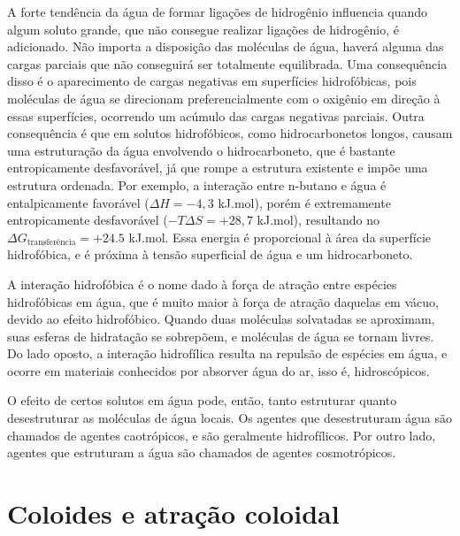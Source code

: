	A forte tendência da água de formar ligações de hidrogênio influencia quando algum soluto grande, que não consegue realizar ligações de hidrogênio, é adicionado. Não importa a disposição das moléculas de água, haverá alguma das cargas parciais que não conseguirá ser totalmente equilibrada. Uma consequência disso é o aparecimento de cargas negativas em superfícies hidrofóbicas, pois moléculas de água se direcionam preferencialmente com o oxigênio em direção à essas superfícies, ocorrendo um acúmulo das cargas negativas parciais. Outra consequência é que em solutos hidrofóbicos, como hidrocarbonetos longos, causam uma estruturação da água envolvendo o hidrocarboneto, que é bastante entropicamente desfavorável, já que rompe a estrutura existente e impõe uma estrutura ordenada. Por exemplo, a interação entre n-butano e água é entalpicamente favorável (\(\Delta H = -4,3\) kJ.mol\menosUm), porém é extremamente entropicamente desfavorável (\(-T\Delta S = +28,7\) kJ.mol\menosUm), resultando no \(\Delta G_{\mathrm{transferência}} = +24.5\) kJ.mol\menosUm. Essa energia é proporcional à área da superfície hidrofóbica, e é próxima à tensão superficial de água e um hidrocarboneto.
	
	A interação hidrofóbica é o nome dado à força de atração entre espécies hidrofóbicas em água, que é muito maior à força de atração daquelas em vácuo, devido ao efeito hidrofóbico. Quando duas moléculas solvatadas se aproximam, suas esferas de hidratação se sobrepõem, e moléculas de água se tornam livres. Do lado oposto, a interação hidrofílica resulta na repulsão de espécies em água, e ocorre em materiais conhecidos por absorver água do ar, isso é, hidroscópicos.
	
	O efeito de certos solutos em água pode, então, tanto estruturar quanto desestruturar as moléculas de água locais. Os agentes que desestruturam água são chamados de agentes caotrópicos, e são geralmente hidrofílicos. Por outro lado, agentes que estruturam a água são chamados de agentes cosmotrópicos. %
	
	
	\section{Coloides e atração coloidal}
	
